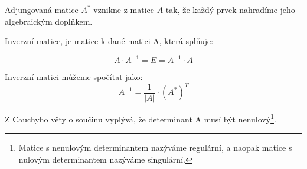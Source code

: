 \begin{definition}
    Adjungovaná matice $A^*$ vznikne z matice $A$ tak, že každý prvek
    nahradíme jeho algebraickým doplňkem.
\end{definition}

\begin{definition}
    Inverzní matice, je matice k dané matici A, která splňuje:

    $$A \cdot A^{-1} = E = A^{-1} \cdot A$$

    Inverzní matici můžeme spočítat jako:
    $$A^{-1} = \frac{1}{|A|}\cdot (A^*)^{T}$$

    Z Cauchyho věty o součinu vyplývá, že determinant A musí být nenulový\footnote{Matice s nenulovým determinantem
    nazýváme regulární, a naopak matice s nulovým determinantem nazýváme singulární.}. %
\end{definition}

